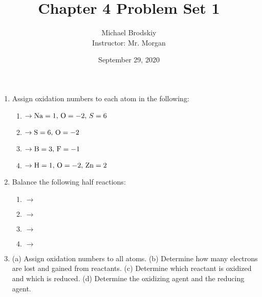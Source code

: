 \documentclass[12pt]{article}
\title{Chapter 4 Problem Set 1}
\date{September 29, 2020}
\author{Michael Brodskiy\\ \small Instructor: Mr. Morgan}
\begin{document}
\maketitle

\begin{enumerate}

  \item Assign oxidation numbers to each atom in the following:

    \begin{enumerate}

      \item {} $\rightarrow \ce{Na}=1,\,\ce{O}=-2,\,S=6$

      \item {} $\rightarrow \ce{S}=6,\,\ce{O}=-2$

      \item {} $\rightarrow \ce{B}=3,\,\ce{F}=-1$

      \item {} $\rightarrow \ce{H}=1,\,\ce{O}=-2,\,\ce{Zn}=2$

    \end{enumerate}

  \item Balance the following half reactions:

    \begin{enumerate}

      \item {} $\rightarrow$ 

      \item {} $\rightarrow$ 

      \item {} $\rightarrow$ 

      \item {} $\rightarrow$ 

    \end{enumerate}

  \item (a) Assign oxidation numbers to all atoms. (b) Determine how many electrons are lost and gained from reactants. (c) Determine which reactant is oxidized and which is reduced. (d) Determine the oxidizing agent and the reducing agent.

    \begin{enumerate}


\end{enumerate}
\end{enumerate}
\end{document}
